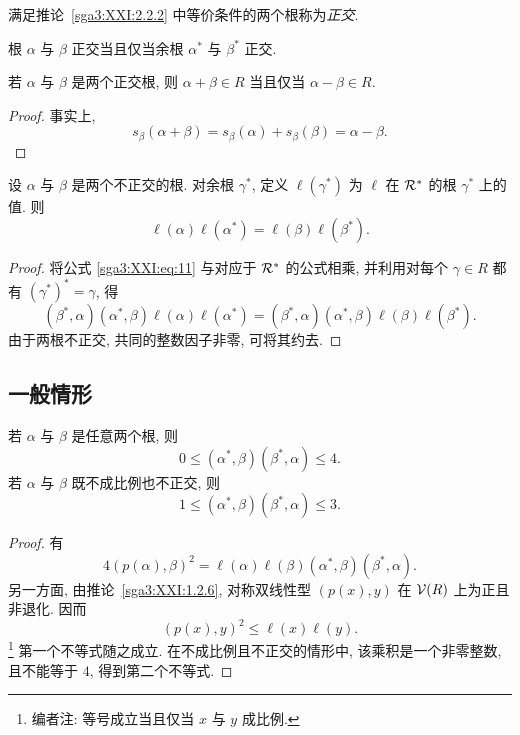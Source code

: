 \begin{definition}\label{sga3:XXI:2.2.3}
满足推论~\ref{sga3:XXI:2.2.2} 中等价条件的两个根称为\emph{正交}.
\end{definition}

\begin{remark}\label{sga3:XXI:2.2.4}
根 \(\alpha\) 与 \(\beta\) 正交当且仅当余根 \(\alpha^\ast\) 与 \(\beta^\ast\) 正交.
\end{remark}

\begin{lemma}\label{sga3:XXI:2.2.5}
若 \(\alpha\) 与 \(\beta\) 是两个正交根, 则 \(\alpha+\beta\in R\) 当且仅当 \(\alpha-\beta\in R\).
\end{lemma}
\begin{proof}
事实上,
\[
 s_\beta(\alpha+\beta)
 =s_\beta(\alpha)+s_\beta(\beta)=\alpha-\beta.
\]
\end{proof}

\begin{lemma}\label{sga3:XXI:2.2.6}
设 \(\alpha\) 与 \(\beta\) 是两个不正交的根. 对余根 \(\gamma^\ast\), 定义 \(\ell(\gamma^\ast)\) 为 \(\ell\) 在 \(\mathcal{R}^\ast\) 的根 \(\gamma^\ast\) 上的值. 则
\begin{equation}
 \ell(\alpha)\ell(\alpha^\ast)
 =\ell(\beta)\ell(\beta^\ast).
 \tag{12}\label{sga3:XXI:eq:12}
\end{equation}
\end{lemma}
\begin{proof}
将公式 \eqref{sga3:XXI:eq:11} 与对应于 \(\mathcal{R}^\ast\) 的公式相乘, 并利用对每个 \(\gamma\in R\) 都有 \((\gamma^\ast)^\ast=\gamma\), 得
\[
 (\beta^\ast,\alpha)(\alpha^\ast,\beta)
 \ell(\alpha)\ell(\alpha^\ast)
 =
 (\beta^\ast,\alpha)(\alpha^\ast,\beta)
 \ell(\beta)\ell(\beta^\ast).
\]
由于两根不正交, 共同的整数因子非零, 可将其约去.
\end{proof}

\subsection{一般情形}
\begin{proposition}\label{sga3:XXI:2.3.1}
若 \(\alpha\) 与 \(\beta\) 是任意两个根, 则
\begin{equation}
 0\leq(\alpha^\ast,\beta)(\beta^\ast,\alpha)\leq4.
 \tag{13}\label{sga3:XXI:eq:13}
\end{equation}
若 \(\alpha\) 与 \(\beta\) 既不成比例也不正交, 则
\[
 1\leq(\alpha^\ast,\beta)(\beta^\ast,\alpha)\leq3.
\]
\end{proposition}
\begin{proof}
有
\[
 4(p(\alpha),\beta)^2
 =\ell(\alpha)\ell(\beta)
   (\alpha^\ast,\beta)(\beta^\ast,\alpha).
\]
另一方面, 由推论~\ref{sga3:XXI:1.2.6}, 对称双线性型 \((p(x),y)\) 在 \(\mathcal{V}(R)\) 上为正且非退化. 因而
\[
 (p(x),y)^2\leq\ell(x)\ell(y).
\]
\footnote{编者注: 等号成立当且仅当 \(x\) 与 \(y\) 成比例.}
第一个不等式随之成立. 在不成比例且不正交的情形中, 该乘积是一个非零整数, 且不能等于 \(4\), 得到第二个不等式.
\end{proof}

